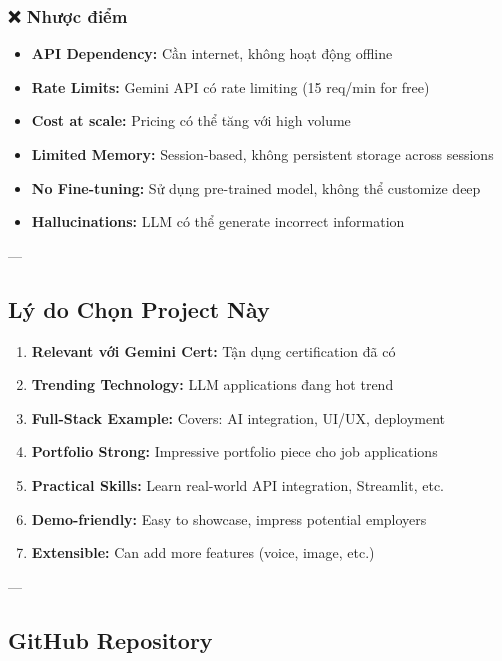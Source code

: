 \documentclass[12pt,a4paper]{article}
\begin{document}
\subsubsection{❌ Nhược điểm}

\begin{itemize}
    \item \textbf{API Dependency:} Cần internet, không hoạt động offline
    \item \textbf{Rate Limits:} Gemini API có rate limiting (15 req/min for free)
    \item \textbf{Cost at scale:} Pricing có thể tăng với high volume
    \item \textbf{Limited Memory:} Session-based, không persistent storage across sessions
    \item \textbf{No Fine-tuning:} Sử dụng pre-trained model, không thể customize deep
    \item \textbf{Hallucinations:} LLM có thể generate incorrect information
\end{itemize}

---

\subsection{Lý do Chọn Project Này}

\begin{enumerate}
    \item \textbf{Relevant với Gemini Cert:} Tận dụng certification đã có
    \item \textbf{Trending Technology:} LLM applications đang hot trend
    \item \textbf{Full-Stack Example:} Covers: AI integration, UI/UX, deployment
    \item \textbf{Portfolio Strong:} Impressive portfolio piece cho job applications
    \item \textbf{Practical Skills:} Learn real-world API integration, Streamlit, etc.
    \item \textbf{Demo-friendly:} Easy to showcase, impress potential employers
    \item \textbf{Extensible:} Can add more features (voice, image, etc.)
\end{enumerate}

---

\subsection{GitHub Repository}
\end{document}
